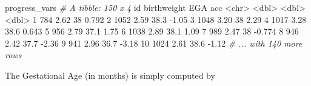 \documentclass[]{article}
\newcommand{\hlnum}[1]{\textcolor[rgb]{0.816,0.125,0.439}{#1}}%
\newcommand{\hlstr}[1]{\textcolor[rgb]{0.251,0.627,0.251}{#1}}%
\newcommand{\hlcom}[1]{\textcolor[rgb]{0.502,0.502,0.502}{\textit{#1}}}%
\newcommand{\hlopt}[1]{\textcolor[rgb]{0,0,0}{#1}}%
\newcommand{\hlstd}[1]{\textcolor[rgb]{0.251,0.251,0.251}{#1}}%
\newenvironment{Shaded}{\begin{myshaded}}{\end{myshaded}}
\newcommand{\DecValTok}[1]{\hlnum{#1}}
\newcommand{\FloatTok}[1]{\hlnum{#1}}
\newcommand{\StringTok}[1]{\hlstr{#1}}
\newcommand{\CommentTok}[1]{\hlcom{#1}}
\newcommand{\OperatorTok}[1]{\hlopt{#1}}
\newcommand{\ErrorTok}[1]{\textcolor{errorcolor}{#1}}
\newcommand{\NormalTok}[1]{\hlstd{#1}}
\begin{document}
\begin{Shaded}
\begin{Highlighting}[]
\NormalTok{progress_vars}
  \CommentTok{# A tibble: 150 x 4}
\NormalTok{     id    birthweight   EGA    acc}
     \OperatorTok{<}\NormalTok{chr}\OperatorTok{>}\StringTok{       }\ErrorTok{<}\NormalTok{dbl}\OperatorTok{>}\StringTok{ }\ErrorTok{<}\NormalTok{dbl}\OperatorTok{>}\StringTok{  }\ErrorTok{<}\NormalTok{dbl}\OperatorTok{>}
\StringTok{   }\DecValTok{1} \DecValTok{784}          \FloatTok{2.62}  \DecValTok{38}    \FloatTok{0.792}
   \DecValTok{2} \DecValTok{1052}         \FloatTok{2.59}  \FloatTok{38.3} \FloatTok{-1.05} 
   \DecValTok{3} \DecValTok{1048}         \FloatTok{3.20}  \DecValTok{38}    \FloatTok{2.29} 
   \DecValTok{4} \DecValTok{1017}         \FloatTok{3.28}  \FloatTok{38.6}  \FloatTok{0.643}
   \DecValTok{5} \DecValTok{956}          \FloatTok{2.79}  \FloatTok{37.1}  \FloatTok{1.75} 
   \DecValTok{6} \DecValTok{1038}         \FloatTok{2.89}  \FloatTok{38.1}  \FloatTok{1.09} 
   \DecValTok{7} \DecValTok{989}          \FloatTok{2.47}  \DecValTok{38}   \FloatTok{-0.774}
   \DecValTok{8} \DecValTok{946}          \FloatTok{2.42}  \FloatTok{37.7} \FloatTok{-2.36} 
   \DecValTok{9} \DecValTok{941}          \FloatTok{2.96}  \FloatTok{36.7} \FloatTok{-3.18} 
  \DecValTok{10} \DecValTok{1024}         \FloatTok{2.61}  \FloatTok{38.6} \FloatTok{-1.12} 
  \CommentTok{# ... with 140 more rows}
\end{Highlighting}
\end{Shaded}

The Gestational Age (in months) is simply computed by
\end{document}
